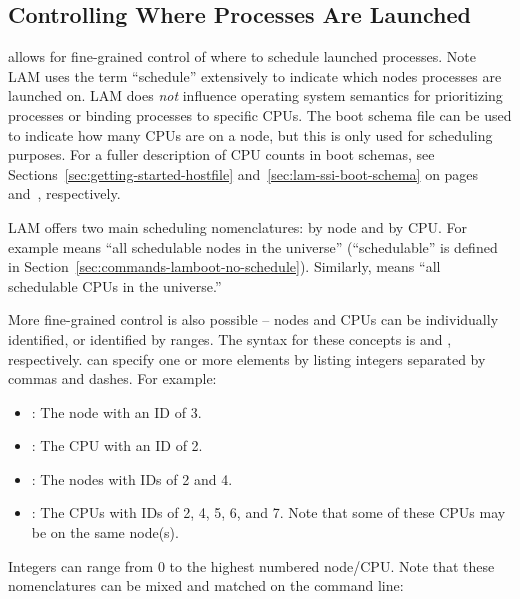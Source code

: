 
\subsection{Controlling Where Processes Are Launched}

 allows for fine-grained control of where to schedule
launched processes.  Note LAM uses the term ``schedule'' extensively
to indicate which nodes processes are launched on.  LAM does {\em not}
influence operating system semantics for prioritizing processes or
binding processes to specific CPUs.  The boot schema file can be used
to indicate how many CPUs are on a node, but this is only used for
scheduling purposes.  For a fuller description of CPU counts in boot
schemas, see Sections~\ref{sec:getting-started-hostfile}
and~\ref{sec:lam-ssi-boot-schema} on
pages~\pageref{sec:getting-started-hostfile}
and~\pageref{sec:lam-ssi-boot-schema}, respectively.

LAM offers two main scheduling nomenclatures: by node and by CPU.  For
example  means ``all schedulable nodes in the universe''
(``schedulable'' is defined in
Section~\ref{sec:commands-lamboot-no-schedule}).  Similarly,
 means ``all schedulable CPUs in the universe.''  

More fine-grained control is also possible -- nodes and CPUs can be
individually identified, or identified by ranges.  The syntax for
these concepts is  and ,
respectively.   can specify one or more elements
by listing integers separated by commas and dashes.  For example:

\begin{itemize}
\item {}: The node with an ID of 3.

\item {}: The CPU with an ID of 2.

\item {}: The nodes with IDs of 2 and 4.

\item {}: The CPUs with IDs of 2, 4, 5, 6, and 7.  Note
  that some of these CPUs may be on the same node(s).
\end{itemize}

Integers can range from 0 to the highest numbered node/CPU.  Note that
these nomenclatures can be mixed and matched on the 
command line:

